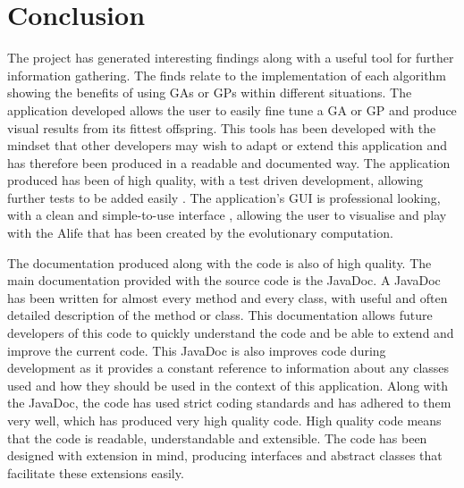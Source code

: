 \documentclass[12pt]{article}
\begin{document}
\section{Conclusion}
The project has generated interesting findings along with a useful tool for further information gathering. The finds relate to the implementation of each algorithm
showing the benefits of using GAs or GPs within different situations. The application developed allows the user to easily fine tune a GA or GP and produce visual results 
from its fittest offspring. This tools has been developed with the mindset that other developers may wish to adapt or extend this application and has therefore
been produced in a readable and documented way. The application produced has been of high quality, with a test driven development, allowing further tests to be
added easily . The application's GUI is professional looking, with a clean and simple-to-use interface , allowing the user to visualise and play with the 
Alife that has been created by the evolutionary computation.

The documentation produced along with the code is also of high quality. The main documentation provided with the source code is the JavaDoc. A JavaDoc has been 
written for almost every method and every class, with useful and often detailed description of the method or class. This documentation allows future developers
of this code to quickly understand the code and be able to extend and improve the current code. This JavaDoc is also improves code during development as it 
provides a constant reference to information about any classes used and how they should be used in the context of this application. 
Along with the JavaDoc, the code has used strict coding standards and has adhered to them very well, which has produced very high quality code. High quality code
means that the code is readable, understandable and extensible. The code has been designed with extension in mind, producing interfaces and abstract classes
that facilitate these extensions easily.
\end{document}
